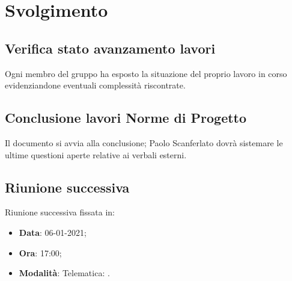 \documentclass[]{article}
\begin{document}
	\newpage

	\section{Svolgimento}
		\subsection{Verifica stato avanzamento lavori}
		Ogni membro del gruppo ha esposto la situazione del proprio lavoro in corso evidenziandone eventuali complessità riscontrate.\\

		\subsection{Conclusione lavori Norme di Progetto}
		Il documento  si avvia alla conclusione; Paolo Scanferlato dovrà sistemare le ultime questioni aperte relative ai verbali esterni.\\

		\subsection{Riunione successiva}
		Riunione successiva fissata in:
		\begin{itemize}
			\item \textbf{Data}: 06-01-2021;
			\item \textbf{Ora}: 17:00;
			\item \textbf{Modalità}: Telematica: .
		\end{itemize}
	
	\newpage
	
\end{document}
